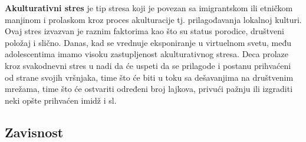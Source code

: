 \documentclass[a4paper]{article}
\begin{document}
{		\hspace{0.5mm}
		\textbf{Akulturativni stres} je tip stresa koji je povezan sa imigrantskom ili etničkom manjinom i prolaskom kroz proces akulturacije tj. prilagođavanja lokalnoj kulturi. Ovaj stres izvazvan je raznim faktorima kao što su status porodice, društveni položaj i slično. Danas, kad se vrednuje eksponiranje u virtuelnom svetu, među adolescentima imamo visoku zastupljenost akulturativnog stresa. Deca prolaze kroz svakodnevni stres u nadi da će uspeti da se prilagode i postanu prihvaćeni od strane svojih vršnjaka, time što će biti u toku sa dešavanjima na društvenim mrežama, time što će ostvariti određeni broj lajkova, privući pažnju ili izgraditi neki opšte prihvaćen imidž i sl.
		
		\subsection{Zavisnost}
		
}
\end{document}
